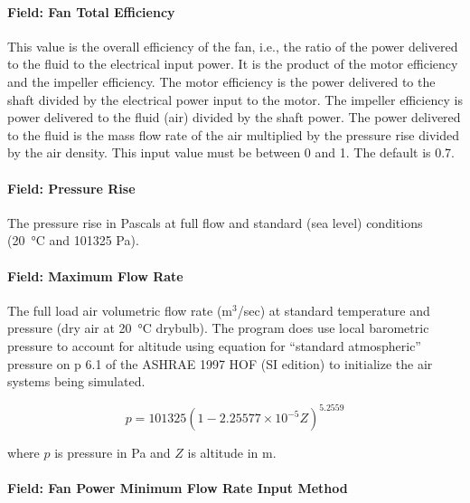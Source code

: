 \paragraph{Field: Fan Total Efficiency}\label{field-fan-total-efficiency-2}

This value is the overall efficiency of the fan, i.e., the ratio of the power delivered to the fluid to the electrical input power. It is the product of the motor efficiency and the impeller efficiency. The motor efficiency is the power delivered to the shaft divided by the electrical power input to the motor. The impeller efficiency is power delivered to the fluid (air) divided by the shaft power. The power delivered to the fluid is the mass flow rate of the air multiplied by the pressure rise divided by the air density. This input value must be between 0 and 1. The default is 0.7.

\paragraph{Field: Pressure Rise}\label{field-pressure-rise-2}

The pressure rise in Pascals at full flow and standard (sea level) conditions (\SI{20}{\celsius} and 101325 Pa).

\paragraph{Field: Maximum Flow Rate}\label{field-maximum-flow-rate-2}

The full load air volumetric flow rate (m\(^{3}\)/sec) at standard temperature and pressure (dry air at \SI{20}{\celsius} drybulb). The program does use local barometric pressure to account for altitude using equation for ``standard atmospheric'' pressure on p 6.1 of the ASHRAE 1997 HOF (SI edition) to initialize the air systems being simulated.

\begin{equation}
p = 101325 \left(1 - 2.25577 \times 10^{-5} Z\right)^{5.2559}
\end{equation}

where \(p\) is pressure in Pa and \(Z\) is altitude in m.

\paragraph{Field: Fan Power Minimum Flow Rate Input Method}\label{field-fan-power-minimum-flow-rate-input-method}

